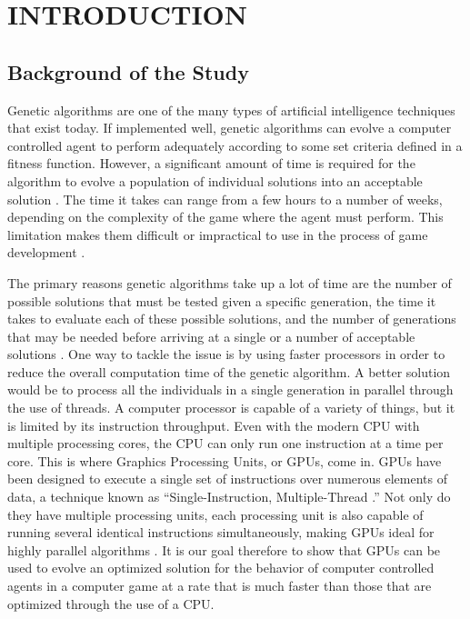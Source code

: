 \chapter{INTRODUCTION}

\section{Background of the Study}

Genetic algorithms are one of the many types of artificial intelligence
techniques that exist today. If implemented well, genetic algorithms can
evolve a computer controlled agent to perform adequately according to some
set criteria defined in a fitness function. However, a significant amount of 
time is required for the algorithm to evolve a population of individual solutions 
into an acceptable solution \cite{Schwab04}. The time it takes can range from
a few hours to a number of weeks, depending on the complexity of the game where
the agent must perform. This limitation makes them difficult or impractical to
use in the process of game development \cite{Schwab04}.

The primary reasons genetic algorithms take up a lot of time are the number of 
possible solutions that must be tested given a specific generation, the time it 
takes to evaluate each of these possible solutions, and the number of generations 
that may be needed before arriving at a single or a number of acceptable solutions \cite{Schwab04}. 
One way to tackle the issue is by using faster processors in order to reduce the
overall computation time of the genetic algorithm. A better solution would
be to process all the individuals in a single generation in parallel through the
use of threads. A computer processor is capable of a variety of things, but it is limited by its instruction throughput. Even with the modern CPU with multiple processing cores, the CPU can only
run one instruction at a time per core. This is where Graphics Processing Units, or GPUs, come in.
GPUs have been designed to execute a single set of instructions over numerous elements
of data, a technique known as ``Single-Instruction, Multiple-Thread \cite{pdf:NVCudaPrgGuide}.''
Not only do they have multiple processing units, each processing unit is also
capable of running several identical instructions simultaneously, making GPUs ideal
for highly parallel algorithms \cite{pdf:NVCudaPrgGuide}. It is our goal therefore to
show that GPUs can be used to evolve an optimized solution for the behavior of computer
controlled agents in a computer game at a rate that is much faster than those that are optimized
through the use of a CPU.

